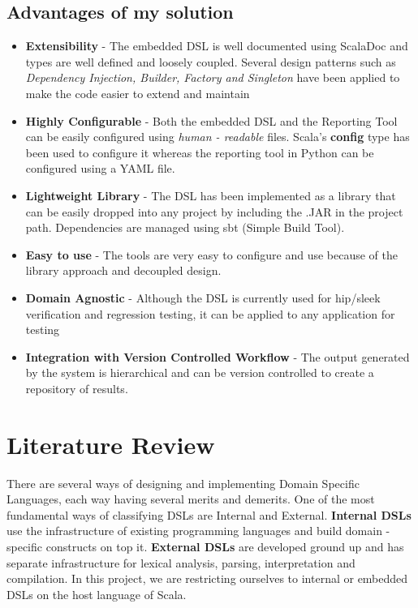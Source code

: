 \documentclass[12pt]{article}
\begin{document}
\subsection{Advantages of my solution}
\begin{itemize}
\item \textbf{Extensibility} - The embedded DSL is well documented using ScalaDoc and types are well defined and loosely coupled. Several design patterns such as \textit{Dependency Injection, Builder, Factory and Singleton} have been applied to make the code easier to extend and maintain
\item \textbf{Highly Configurable} - Both the embedded DSL and the Reporting Tool can be easily configured using \textit{human - readable} files. Scala's \textbf{config} type has been used to configure it whereas the reporting tool in Python can be configured using a YAML file.
\item \textbf{Lightweight Library} - The DSL has been implemented as a library that can be easily dropped into any project by including the .JAR in the project path. Dependencies are managed using sbt (Simple Build Tool).
\item \textbf{Easy to use} - The tools are very easy to configure and use because of the library approach and decoupled design.
\item \textbf{Domain Agnostic} - Although the DSL is currently used for hip/sleek verification and regression testing, it can be applied to any application for testing
\item \textbf{Integration with Version Controlled Workflow} - The output generated by the system is hierarchical and can be version controlled to create a repository of results.
\end{itemize}


\newpage
\section{Literature Review}
There are several ways of designing and implementing Domain Specific Languages, each way having several merits and demerits. One of the most fundamental ways of classifying DSLs are Internal and External. \textbf{Internal DSLs} use the infrastructure of existing programming languages and build domain - specific constructs on top it. \textbf{External DSLs} are developed ground up and has separate infrastructure for lexical analysis, parsing, interpretation and compilation. In this project, we are restricting ourselves to internal or embedded DSLs on the host language of Scala.
\bigskip
\end{document}
